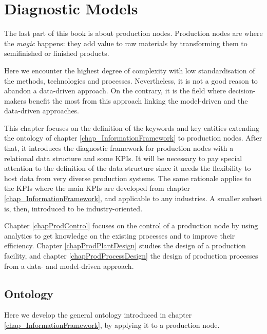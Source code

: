 \chapter{Diagnostic Models}

The last part of this book is about production nodes. Production nodes are where the \textit{magic} happens: they add value to raw materials by transforming them to semifinished or finished products. \par

Here we encounter the highest degree of complexity with low standardisation of the methods, technologies and processes. Nevertheless, it is not a good reason to abandon a data-driven approach.  On the contrary, it is the field where decision-makers benefit the most from this approach linking the model-driven and the data-driven approaches.\par

This chapter focuses on the definition of the keywords and key entities extending the ontology of chapter \ref{chap_InformationFramework} to production nodes. After that, it introduces the diagnostic framework for production nodes with a relational data structure and some KPIs. It will be necessary to pay special attention to the definition of the data structure since it needs the flexibility to host data from very diverse production systems. The same rationale applies to the KPIs where the main KPIs are developed from chapter \ref{chap_InformationFramework}, and applicable to any industries. A smaller subset is, then, introduced to be industry-oriented.\par

Chapter \ref{chapProdControl} focuses on the control of a production node by using analytics to get knowledge on the existing processes and to improve their efficiency. Chapter \ref{chapProdPlantDesign} studies the design of a production facility, and chapter \ref{chapProdProcessDesign} the design of production processes from a data- and model-driven approach.

\section{Ontology}
Here we develop the general ontology introduced in chapter \ref{chap_InformationFramework}, by applying it to a production node. 


